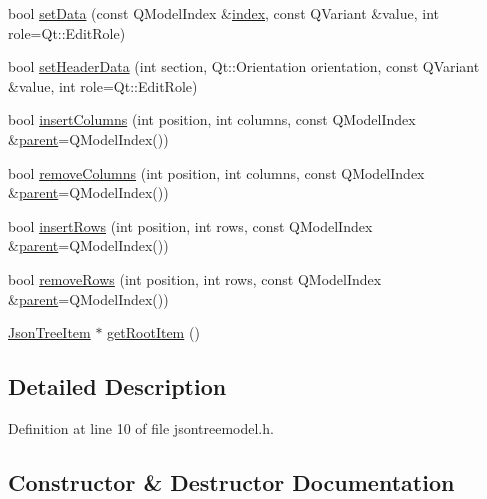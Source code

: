 \begin{DoxyCompactItemize}
bool \hyperlink{class_json_tree_model_a0bf2bb16623502aa6a2a4043079f276c}{set\+Data} (const Q\+Model\+Index \&\hyperlink{class_json_tree_model_ac8be89cc178ef5151479be23006d18e3}{index}, const Q\+Variant \&value, int role=Qt\+::\+Edit\+Role)
\item 
bool \hyperlink{class_json_tree_model_aba2b3c92fedfff20fd926a3ff2c6b266}{set\+Header\+Data} (int section, Qt\+::\+Orientation orientation, const Q\+Variant \&value, int role=Qt\+::\+Edit\+Role)
\item 
bool \hyperlink{class_json_tree_model_aabc3f2fa08ef557663f8a4e49a214ef4}{insert\+Columns} (int position, int columns, const Q\+Model\+Index \&\hyperlink{class_json_tree_model_aea54120cdf66d49e8f0ad176eed8fc99}{parent}=Q\+Model\+Index())
\item 
bool \hyperlink{class_json_tree_model_a238f7748e25bf703b09775e7a1f97609}{remove\+Columns} (int position, int columns, const Q\+Model\+Index \&\hyperlink{class_json_tree_model_aea54120cdf66d49e8f0ad176eed8fc99}{parent}=Q\+Model\+Index())
\item 
bool \hyperlink{class_json_tree_model_a44b67b632a69a48b087a5bc7bdf7caf5}{insert\+Rows} (int position, int rows, const Q\+Model\+Index \&\hyperlink{class_json_tree_model_aea54120cdf66d49e8f0ad176eed8fc99}{parent}=Q\+Model\+Index())
\item 
bool \hyperlink{class_json_tree_model_ae62d2fc8a4989d5d13880ee4ba45559f}{remove\+Rows} (int position, int rows, const Q\+Model\+Index \&\hyperlink{class_json_tree_model_aea54120cdf66d49e8f0ad176eed8fc99}{parent}=Q\+Model\+Index())
\item 
\hyperlink{class_json_tree_item}{Json\+Tree\+Item} $\ast$ \hyperlink{class_json_tree_model_a2c9c8c6a1feb5de57d38d808061a6482}{get\+Root\+Item} ()
\end{DoxyCompactItemize}


\subsection{Detailed Description}


Definition at line 10 of file jsontreemodel.\+h.



\subsection{Constructor \& Destructor Documentation}
\mbox{\label{class_json_tree_model_ae578e41b3c06ef9ae969b0e7e43c8f98}} 
